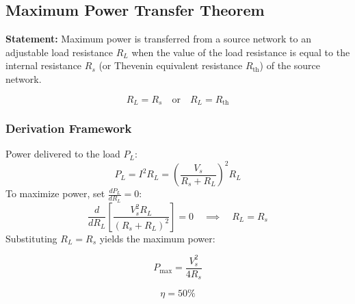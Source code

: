 \documentclass[11pt,a4paper]{article}
\begin{document}
\subsection{Maximum Power Transfer Theorem}
\begin{pyqbox}
    \textbf{Statement:} Maximum power is transferred from a source network to an adjustable load resistance $R_L$ when the value of the load resistance is equal to the internal resistance $R_s$ (or Thevenin equivalent resistance $R_{\text{th}}$) of the source network.
\end{pyqbox}

\begin{center}
\end{center}

\begin{formulabox}
    \[ R_L = R_s \quad \text{or} \quad R_L = R_{\text{th}} \]
\end{formulabox}

\subsubsection{Derivation Framework}
Power delivered to the load $P_L$:
\[ P_L = I^2 R_L = \left( \frac{V_s}{R_s + R_L} \right)^2 R_L \]
To maximize power, set $\frac{dP_L}{dR_L} = 0$:
\[ \frac{d}{dR_L} \left[ \frac{V_s^2 R_L}{(R_s + R_L)^2} \right] = 0 \quad \implies \quad R_L = R_s \]
Substituting $R_L = R_s$ yields the maximum power:
\begin{formulabox}
    \[ P_{\text{max}} = \frac{V_s^2}{4R_s} \]
\end{formulabox}

\begin{formulabox}
    \[ \eta = 50\% \]
\end{formulabox}
\end{document}
